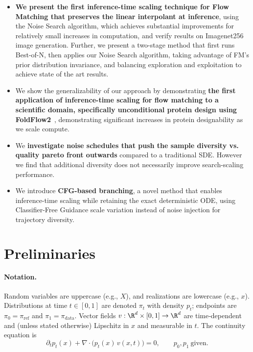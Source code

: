 \documentclass{article} %
\newcommand{\rev}[1]{{\color{blue}#1}}
\begin{document}
\begin{itemize}[noitemsep,topsep=0pt,parsep=0pt,partopsep=0pt,leftmargin=*]
    \item \textbf{We present the first inference-time scaling technique for Flow Matching that preserves the linear interpolant at inference}, using the Noise Search algorithm, which achieves substantial improvements for relatively small increases in computation, and verify results on Imagenet256 image generation. Further, we present a two-stage method that first runs Best-of-N, then applies our Noise Search algorithm, taking advantage of FM's prior distribution invariance, and balancing exploration and exploitation to achieve state of the art results.
    \item We show the generalizability of our approach by demonstrating \textbf{the first application of inference-time scaling for flow matching to a scientific domain, specifically unconditional protein design using FoldFlow2}~\cite{foldflow2}, demonstrating significant increases in protein designability as we scale compute.
    \item We \textbf{investigate noise schedules that push the sample diversity vs. quality pareto front outwards} compared to a traditional SDE. However we find that additional diversity does not necessarily improve search-scaling performance.
    \item \rev{We introduce \textbf{CFG-based branching}, a novel method that enables inference-time scaling while retaining the exact deterministic ODE, using Classifier-Free Guidance scale variation instead of noise injection for trajectory diversity.}
\end{itemize}

\section{Preliminaries}
\label{sec:preliminaries}

\paragraph{Notation.} Random variables are uppercase (e.g., $X$), and realizations are lowercase (e.g., $x$). Distributions at time $t\in[0,1]$ are denoted $\pi_t$ with density $p_t$; endpoints are $\pi_0=\pi_{\mathrm{ref}}$ and $\pi_1=\pi_{\mathrm{data}}$. Vector fields $v:\R^d\times[0,1]\to\R^d$ are time‑dependent and (unless stated otherwise) Lipschitz in $x$ and measurable in $t$. The continuity equation is
\begin{equation}
\label{eq:continuity}
\partial_t p_t(x) + \nabla\!\cdot\!\big(p_t(x)\,v(x,t)\big)=0,\qquad p_0,p_1\ \text{given}.
\end{equation}
\end{document}
